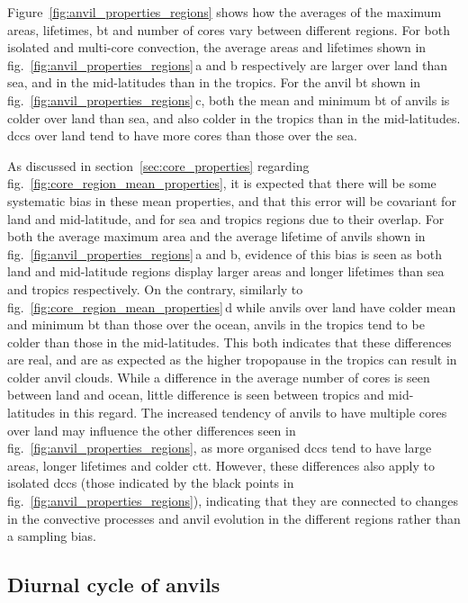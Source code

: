 Figure~\ref{fig:anvil_properties_regions} shows how the averages of the maximum areas, lifetimes, \acrshort{bt} and number of cores vary between different regions.
For both isolated and multi-core convection, the average areas and lifetimes shown in fig.~\ref{fig:anvil_properties_regions}\,a and b respectively are larger over land than sea, and in the mid-latitudes than in the tropics.
For the anvil \acrshort{bt} shown in fig.~\ref{fig:anvil_properties_regions}\,c, both the mean and minimum \acrshort{bt} of anvils is colder over land than sea, and also colder in the tropics than in the mid-latitudes.
\acrshort{dcc}s over land tend to have more cores than those over the sea.

As discussed in section~\ref{sec:core_properties} regarding fig.~\ref{fig:core_region_mean_properties}, it is expected that there will be some systematic bias in these mean properties, and that this error will be covariant for land and mid-latitude, and for sea and tropics regions due to their overlap.
For both the average maximum area and the average lifetime of anvils shown in fig.~\ref{fig:anvil_properties_regions}\,a and b, evidence of this bias is seen as both land and mid-latitude regions display larger areas and longer lifetimes than sea and tropics respectively.
On the contrary, similarly to fig.~\ref{fig:core_region_mean_properties}\,d while anvils over land have colder mean and minimum \acrshort{bt} than those over the ocean, anvils in the tropics tend to be colder than those in the mid-latitudes.
This both indicates that these differences are real, and are as expected as the higher tropopause in the tropics can result in colder anvil clouds.
While a difference in the average number of cores is seen between land and ocean, little difference is seen between tropics and mid-latitudes in this regard.
The increased tendency of anvils to have multiple cores over land may influence the other differences seen in fig.~\ref{fig:anvil_properties_regions}, as more organised \acrshort{dcc}s tend to have large areas, longer lifetimes and colder \acrshort{ctt}.
However, these differences also apply to isolated \acrshort{dcc}s (those indicated by the black points in fig.~\ref{fig:anvil_properties_regions}), indicating that they are connected to changes in the convective processes and anvil evolution in the different regions rather than a sampling bias.

\subsection{Diurnal cycle of anvils}

